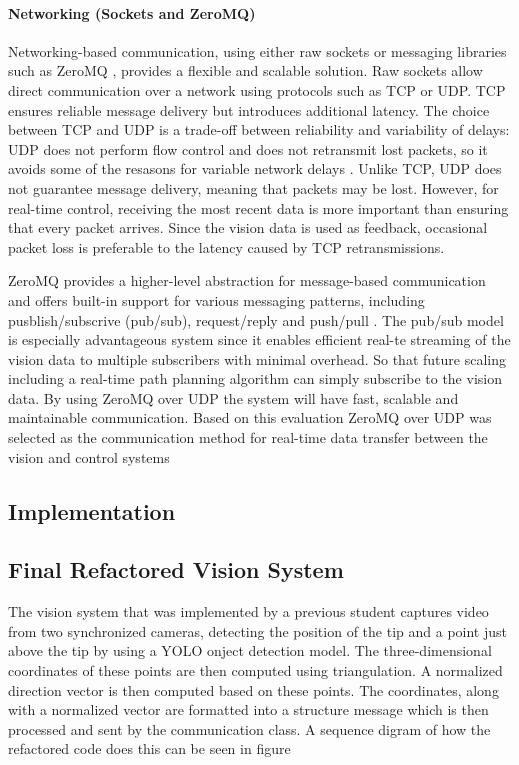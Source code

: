 \paragraph*{Networking (Sockets and ZeroMQ)}
Networking-based communication, using either raw sockets or messaging libraries such as ZeroMQ , provides a flexible and scalable solution. Raw sockets allow direct communication over a network using protocols such as TCP or UDP. TCP ensures reliable message delivery but introduces additional latency. The choice between TCP and UDP is a trade-off between reliability and variability of delays: UDP does not perform flow control and does not retransmit lost packets, so it avoids some of the resasons for variable network delays \cite{kleppmann_designing_2017}. Unlike TCP, UDP does not guarantee message delivery, meaning that packets may be lost.  However, for real-time control, receiving the most recent data is more important than ensuring that every packet arrives. Since the vision data is used as feedback, occasional packet loss is preferable to the latency caused by TCP retransmissions. 

ZeroMQ provides a higher-level abstraction for message-based communication and offers built-in support for various messaging patterns, including pusblish/subscrive (pub/sub), request/reply and push/pull . The pub/sub model is especially advantageous system since it enables efficient real-te streaming of the vision data to multiple subscribers with minimal overhead. So that future scaling including a real-time path planning algorithm can simply subscribe to the vision data. By using ZeroMQ over UDP the system will have fast, scalable and maintainable communication. Based on this evaluation ZeroMQ over UDP was selected as the communication method for real-time data transfer between the vision and control systems

\subsection{Implementation}

\subsection{Final Refactored Vision System}


The vision system that was implemented by a previous student  captures video from two synchronized cameras, detecting the position of the tip and a point just above   the tip by using a YOLO onject detection model. The three-dimensional coordinates of these points are then computed using triangulation. A normalized direction vector is then computed based on these points. The coordinates, along with a normalized vector are formatted into a structure message which is then processed and sent by the communication class. A sequence digram of how the refactored code does this can be seen in figure

